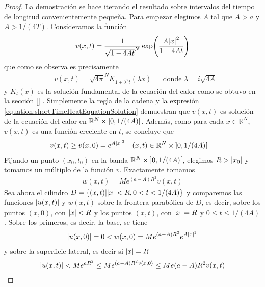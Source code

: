\documentclass{article}
\newcommand{\realNumbers}{\mathbb{R}}
\newcommand{\leftOpenInterval}{\left]}
\newcommand{\rightOpenInterval}{\right[}
\newcommand{\leftClosedInterval}{\left[}
\newcommand{\rightClosedInterval}{\right]}
\newcommand{\interval}[3]{%
  \ifstrequal{#1}{oo}{%
    \leftOpenInterval #2, #3 \rightOpenInterval%
  }{%
    \ifstrequal{#1}{co}{%
      \leftClosedInterval #2, #3 \rightOpenInterval%
    }{%
      \ifstrequal{#1}{oc}{
        \leftOpenInterval #2, #3 \rightClosedInterval%
      }{%
        \ifstrequal{#1}{cc}{
          \leftClosedInterval #2, #3 \rightClosedInterval
        }{%
        }%
      }%
    }%
  }%
}
\theoremstyle{remark}
\begin{document}
\begin{proof}
  La demostración se hace iterando el resultado sobre intervalos del tiempo de longitud convenientemente pequeña.
  Para empezar elegimos \(A\) tal que \(A > a\) y \(A > 1 / (4 T)\).
  Consideramos la función
  \begin{align}
    v(x, t) = \frac{1}{\sqrt{1 - 4 A t}^N} \exp\!\left(\frac{A \abs{x}^2}{1 - 4 A t}\right)
  \end{align}
  que como se observa es precisamente
  \begin{align}
    \label{equation:shortTimeHeatEquationSolution}
    &v(x, t)
    =
    \sqrt{4 \pi}^N K_{1 + \lambda^2 t} (\lambda x)
    && \text{donde } \lambda = i \sqrt{4A}
  \end{align}
  y \(K_t(x)\) es la solución fundamental de la ecuación del calor como se obtuvo en la sección 
  \ref{}  %
  .
  Simplemente la regla de la cadena y la expresión
  \ref{equation:shortTimeHeatEquationSolution}
  demuestran que \(v(x, t)\) es solución de la ecuación del calor en \(\realNumbers^N \times \interval{oo}{0}{1 / (4 A)}\).
  Además, como para cada \(x \in \realNumbers^N\), \(v(x, t)\) es una función creciente en \(t\), se concluye que
  \begin{align}
    &v(x, t)
    \geq
    v(x, 0)
    =
    e^{A \abs{x}^2}
    && (x, t) \in \realNumbers^N \times \interval{oo}{0}{1 / (4 A)}
  \end{align}
  Fijando un punto \((x_0, t_0)\) en la banda \(\realNumbers^N \times \interval{oo}{0}{1 / (4 A)}\), elegimos \(R > \abs{x_0}\) y tomamos un múltiplo de la función \(v\).
  Exactamente tomamos
  \begin{align}
    w(x, t)
    =
    M e^{(a - A) R^2} v(x, t)
  \end{align}
  Sea ahora el cilindro \(D = \{(x, t) | \abs{x} < R, 0 < t < 1 / (4 A)\}\) y comparemos las funciones \(\abs{u(x, t)}\) y \(w(x, t)\) sobre la frontera parabólica de \(D\), es decir, sobre los puntos \((x, 0)\), con \(\abs{x} < R\) y los puntos \((x, t)\), con \(\abs{x} = R\) y \(0 \leq t \leq 1 / (4 A)\).
  Sobre los primeros, es decir, la base, se tiene 
  \begin{align}
    \abs{u(x, 0)}
    =
    0
    <
    w(x, 0)
    =
    M e^{(a - A) R^2} e^{A \abs{x}^2}
  \end{align}
  y sobre la superficie lateral, es decir si \(\abs{x} = R\)
  \begin{align}
    \abs{u(x, t)}
    <
    M e^{a R^2}
    \leq
    M e^{(a - A) R^2 v(x, 0)}
    \leq
    M e {(a - A) R^2} v(x, t)

\end{align}
\end{proof}
\end{document}
